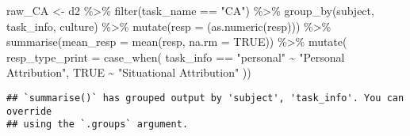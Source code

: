 \documentclass[
]{article}
\newenvironment{Shaded}{\begin{snugshade}}{\end{snugshade}}
\newcommand{\AttributeTok}[1]{\textcolor[rgb]{0.77,0.63,0.00}{#1}}
\newcommand{\ConstantTok}[1]{\textcolor[rgb]{0.00,0.00,0.00}{#1}}
\newcommand{\FunctionTok}[1]{\textcolor[rgb]{0.00,0.00,0.00}{#1}}
\newcommand{\NormalTok}[1]{#1}
\newcommand{\OtherTok}[1]{\textcolor[rgb]{0.56,0.35,0.01}{#1}}
\newcommand{\SpecialCharTok}[1]{\textcolor[rgb]{0.00,0.00,0.00}{#1}}
\newcommand{\StringTok}[1]{\textcolor[rgb]{0.31,0.60,0.02}{#1}}
\begin{document}
\begin{Shaded}
\begin{Highlighting}[]
\NormalTok{raw\_CA }\OtherTok{\textless{}{-}}\NormalTok{ d2 }\SpecialCharTok{\%\textgreater{}\%} 
  \FunctionTok{filter}\NormalTok{(task\_name }\SpecialCharTok{==} \StringTok{"CA"}\NormalTok{) }\SpecialCharTok{\%\textgreater{}\%} 
  \FunctionTok{group\_by}\NormalTok{(subject, task\_info, culture) }\SpecialCharTok{\%\textgreater{}\%} 
  \FunctionTok{mutate}\NormalTok{(}\AttributeTok{resp =}\NormalTok{ (}\FunctionTok{as.numeric}\NormalTok{(resp))) }\SpecialCharTok{\%\textgreater{}\%} 
  \FunctionTok{summarise}\NormalTok{(}\AttributeTok{mean\_resp =} \FunctionTok{mean}\NormalTok{(resp, }\AttributeTok{na.rm =} \ConstantTok{TRUE}\NormalTok{)) }\SpecialCharTok{\%\textgreater{}\%} 
  \FunctionTok{mutate}\NormalTok{(}
         \AttributeTok{resp\_type\_print =} \FunctionTok{case\_when}\NormalTok{(}
\NormalTok{           task\_info }\SpecialCharTok{==} \StringTok{"personal"} \SpecialCharTok{\textasciitilde{}} \StringTok{"Personal Attribution"}\NormalTok{, }
           \ConstantTok{TRUE} \SpecialCharTok{\textasciitilde{}} \StringTok{"Situational Attribution"}
\NormalTok{         ))}
\end{Highlighting}
\end{Shaded}

\begin{verbatim}
## `summarise()` has grouped output by 'subject', 'task_info'. You can override
## using the `.groups` argument.
\end{verbatim}
\end{document}
